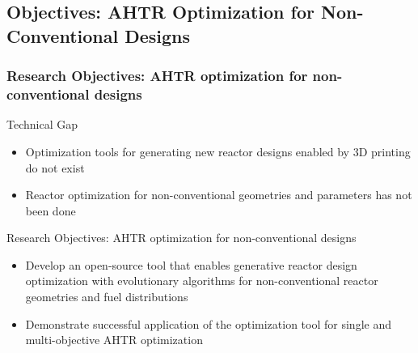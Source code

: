\subsection{Objectives: AHTR Optimization for Non-Conventional Designs}
\begin{frame}
    \frametitle{Research Objectives: AHTR optimization for non-conventional designs}
    \begin{block}{Technical Gap}
      \begin{itemize}
        \item Optimization tools for generating new reactor designs enabled by
        3D printing do not exist
        \item Reactor optimization for non-conventional geometries and parameters 
        has not been done 
      \end{itemize}
    \end{block}
    \begin{block}{Research Objectives: AHTR optimization for non-conventional designs}
        \begin{itemize}
            \item Develop an open-source tool that enables generative reactor design 
            optimization with evolutionary algorithms for non-conventional reactor
            geometries and fuel distributions
            \item Demonstrate successful application of the optimization tool 
            for single and multi-objective AHTR optimization
        \end{itemize}
    \end{block}
  \end{frame}

